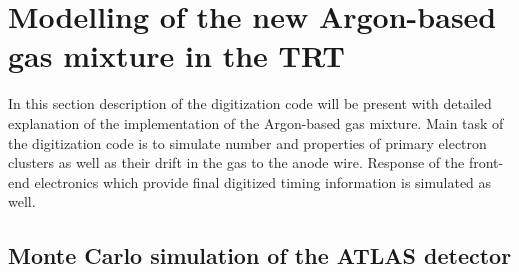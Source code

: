 \section{Modelling of the new Argon-based gas mixture in the TRT}
\label{sec:digi_argon}

In this section description of the digitization code will be present with detailed explanation of the implementation of the Argon-based gas mixture.
Main task of the digitization code is to simulate number and properties of primary electron clusters as well as their drift in the gas to the anode wire.
Response of the front-end electronics which provide final digitized timing information is simulated as well.

\subsection{Monte Carlo simulation of the ATLAS detector}

